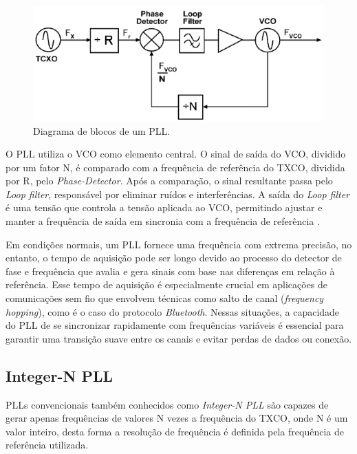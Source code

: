 \begin{figure}[htb]
	\caption{Diagrama de blocos de um PLL.}
	\begin{center}
		\includegraphics[scale=0.6]{img/pll_blocos.png}
	\end{center}
	\label{fig:pll_blocks}
\end{figure}

O PLL utiliza o VCO como elemento central. O sinal de saída do VCO, dividido por um fator N, é comparado com a frequência de referência do TXCO, dividida por R, pelo  \textit{Phase-Detector}. Após a comparação, o sinal resultante passa pelo \textit{Loop filter}, responsável por eliminar ruídos e interferências. A saída do \textit{Loop filter} é uma tensão que controla a tensão aplicada ao VCO, permitindo ajustar e manter a frequência de saída em sincronia com a frequência de referência \cite{barrett_1999_fractionalintegern}.

Em condições normais, um PLL fornece uma frequência com extrema precisão, no entanto, o tempo de aquisição pode ser longo devido ao processo do detector de fase e frequência que avalia e gera sinais com base nas diferenças em relação à referência. Esse tempo de aquisição é especialmente crucial em aplicações de comunicações sem fio que envolvem técnicas como salto de canal (\textit{frequency hopping}), como é o caso do protocolo \textit{Bluetooth}. Nessas situações, a capacidade do PLL de se sincronizar rapidamente com frequências variáveis é essencial para garantir uma transição suave entre os canais e evitar perdas de dados ou conexão.
\subsection{Integer-N PLL}

PLLs convencionais também conhecidos como \textit{Integer-N PLL} são capazes de gerar apenas frequências de valores N vezes a frequência do TXCO, onde N é um valor inteiro, desta forma a resolução de frequência é definida pela frequência de referência utilizada. 

